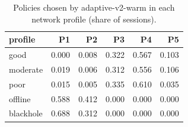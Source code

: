 \begin{table}[htbp]
\centering
\small
\caption{Policies chosen by adaptive-v2-warm in each network profile (share of sessions).}
\label{tab:policy_share_adaptive_v2_warm}
\begin{tabular}{l r r r r r}
\toprule
profile & P1 & P2 & P3 & P4 & P5 \\
\midrule
good & 0.000 & 0.008 & 0.322 & 0.567 & 0.103 \\
moderate & 0.019 & 0.006 & 0.312 & 0.556 & 0.106 \\
poor & 0.015 & 0.005 & 0.335 & 0.610 & 0.035 \\
offline & 0.588 & 0.412 & 0.000 & 0.000 & 0.000 \\
blackhole & 0.688 & 0.312 & 0.000 & 0.000 & 0.000 \\
\bottomrule
\end{tabular}
\end{table}
